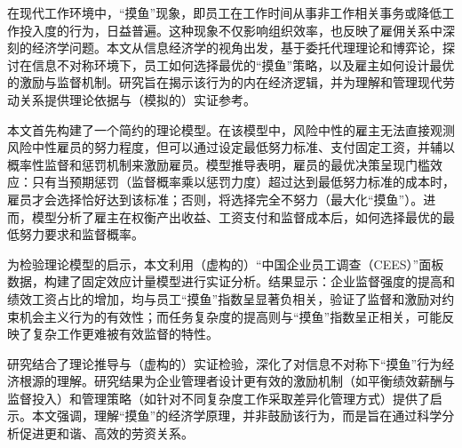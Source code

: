 \begin{cabstract}

	在现代工作环境中，“摸鱼”现象，即员工在工作时间从事非工作相关事务或降低工作投入度的行为，日益普遍。这种现象不仅影响组织效率，也反映了雇佣关系中深刻的经济学问题。本文从{信息经济学}的视角出发，基于{委托代理理论}和{博弈论}，探讨在{信息不对称}环境下，员工如何选择最优的“{摸鱼}”策略，以及雇主如何设计最优的{激励}与{监督}机制。研究旨在揭示该行为的内在经济逻辑，并为理解和管理现代劳动关系提供理论依据与（模拟的）实证参考。

	本文首先构建了一个简约的理论模型。在该模型中，风险中性的雇主无法直接观测风险中性雇员的努力程度，但可以通过设定最低努力标准、支付固定工资，并辅以概率性{监督}和惩罚机制来激励雇员。模型推导表明，雇员的最优决策呈现门槛效应：只有当预期惩罚（监督概率乘以惩罚力度）超过达到最低努力标准的成本时，雇员才会选择恰好达到该标准；否则，将选择完全不努力（最大化“摸鱼”）。进而，模型分析了雇主在权衡产出收益、工资支付和监督成本后，如何选择最优的最低努力要求和监督概率。

	为检验理论模型的启示，本文利用（虚构的）“中国企业员工调查（CEES）”面板数据，构建了固定效应计量模型进行实证分析。结果显示：企业{监督}强度的提高和{绩效工资}占比的增加，均与员工“摸鱼”指数呈显著负相关，验证了{监督}和{激励}对约束机会主义行为的有效性；而任务复杂度的提高则与“摸鱼”指数呈正相关，可能反映了复杂工作更难被有效监督的特性。

	研究结合了理论推导与（虚构的）实证检验，深化了对{信息不对称}下“摸鱼”行为经济根源的理解。研究结果为企业管理者设计更有效的{激励}机制（如平衡绩效薪酬与监督投入）和管理策略（如针对不同复杂度工作采取差异化管理方式）提供了启示。本文强调，理解“摸鱼”的经济学原理，并非鼓励该行为，而是旨在通过科学分析促进更和谐、高效的劳资关系。
\end{cabstract}

